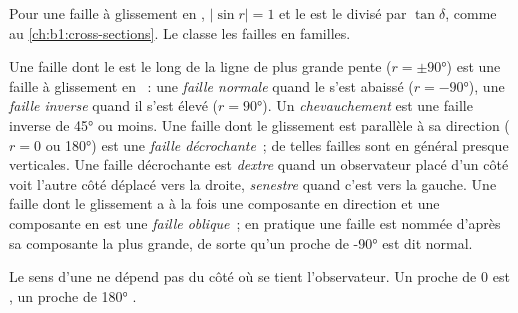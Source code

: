 Pour une faille à glissement en , $|\sin r| = 1$ et le  est le  divisé par
$\tan\delta$, comme au \cref{ch:b1:cross-sections}. Le  classe les failles
en familles.

\begin{definition}\label{def:b1:faults-folds-fabrics:fault-types}
Une faille dont le  est le long de la ligne de plus grande pente ($r = \pm\ang{90}$) est une
faille à glissement en ~: une \emph{faille normale} quand le 
s'est abaissé ($r = \ang{-90}$), une \emph{faille inverse} quand il s'est élevé
($r = \ang{90}$). Un \emph{chevauchement} est une faille inverse de  \ang{45} ou moins.
Une faille dont le glissement est parallèle à sa direction ($r = 0$ ou \ang{180}) est une
\emph{faille décrochante}~; de telles failles sont en général
presque verticales. Une faille décrochante est \emph{dextre}
quand un observateur placé d'un côté voit l'autre côté
déplacé vers la droite, \emph{senestre} quand c'est vers
la gauche. Une faille dont le glissement a à la fois une composante en direction et une composante en 
est une \emph{faille oblique}~; en pratique une
faille est nommée d'après sa composante la plus grande, de sorte qu'un  proche de \ang{-90} est
dit normal.
\end{definition}

\begin{proposition}\label{prop:b1:faults-folds-fabrics:sense}
Le sens d'une  ne dépend pas du côté où se
tient l'observateur. Un  proche de $0$ est , un  proche de \ang{180} .
\end{proposition}

